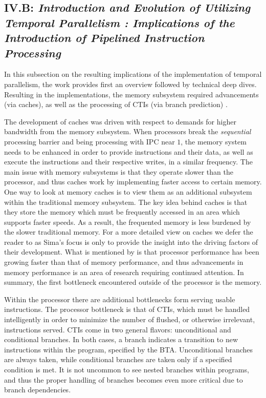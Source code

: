 \documentclass{article}
\begin{document}
\subsection{\textbf{IV.B}: \emph{Introduction and Evolution of Utilizing Temporal Parallelism : Implications of the Introduction of Pipelined Instruction Processing}}
In this subsection on the resulting implications of the implementation of temporal parallelism, the work provides first an overview followed by technical deep dives.
Resulting in the implementations, the memory subsystem required advancements (via caches), as well as the processing of CTIs (via branch prediction) \cite{Sima}.

The development of caches was driven with respect to demands for higher bandwidth from the memory subsystem.
When processors break the \emph{sequential} processing barrier and being processing with IPC near $1$, the memory system needs to be enhanced in order to provide instructions and their data, as well as execute the instructions and their respective writes, in a similar frequency.
The main issue with memory subsystems is that they operate slower than the processor, and thus caches work by implementing faster access to certain memory.
One way to look at memory caches is to view them as an additional subsystem within the traditional memory subsystem.
The key idea behind caches is that they store the memory which must be frequently accessed in an area which supports faster speeds.
As a result, the frequented memory is less burdened by the slower traditional memory.
For a more detailed view on caches we defer the reader to \cite[Section~6.3]{Bryant} as Sima's focus is only to provide the insight into the driving factors of their development.
What is mentioned by \cite{Sima} is that processor performance has been growing faster than that of memory performance, and thus advancements in memory performance is an area of research requiring continued attention.
In summary, the first bottleneck encountered outside of the processor is the memory.

Within the processor there are additional bottlenecks form serving usable instructions.
The processor bottleneck is that of CTIs, which must be handled intelligently in order to minimize the number of flushed, or otherwise irrelevant, instructions served.
CTIs come in two general flavors: unconditional and conditional branches.
In both cases, a branch indicates a transition to new instructions within the program, specified by the BTA.
Unconditional branches are always taken, while conditional branches are taken only if a specified condition is met.
It is not uncommon to see nested branches within programs, and thus the proper handling of branches becomes even more critical due to branch dependencies.
\end{document}
